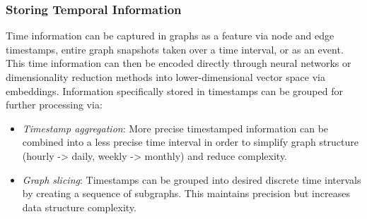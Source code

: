 \subsubsection{Storing Temporal Information} %
Time information can be captured in graphs as a feature via node and edge timestamps, entire graph snapshots taken over a time interval, or as an event. This time information can then be encoded directly through neural networks or dimensionality reduction methods into lower-dimensional vector space via embeddings. Information specifically stored in timestamps can be grouped for further processing via:
\begin{itemize}
    \item \textit{Timestamp aggregation}\cite{george_time-aggregated_2006}: More precise timestamped information can be combined into a less precise time interval in order to simplify graph structure (hourly -> daily, weekly -> monthly) and reduce complexity. 
    \item \textit{Graph slicing}\cite{crichton_neural_2018}: Timestamps can be grouped into desired discrete time intervals by creating a sequence of subgraphs. This maintains precision but increases data structure complexity.
\end{itemize}